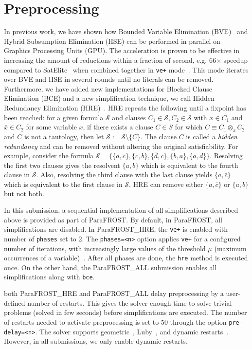 \documentclass[conference]{IEEEtran}
\newcommand{\parafrost}{ParaFROST\xspace}
\newcommand{\parafrostHRE}{ParaFROST\_HRE\xspace}
\newcommand{\parafrostALL}{ParaFROST\_ALL\xspace}
\begin{document}
\section{Preprocessing}
In previous work, we have shown how Bounded Variable Elimination (BVE)~\cite{niver,satelite} and Hybrid Subsumption Elimination (HSE) can be performed in parallel on Graphics Processing Units (GPU). The acceleration is proven to be effective in increasing the amount of reductions within a fraction of second, e.g. 66$\times$ speedup compared to SatElite~\cite{satelite} when combined together in \texttt{ve+} mode~\cite{sigmaTacas}. This mode iterates over BVE and HSE in several rounds until no literals can be removed. 
Furthermore, we have added new implementations for Blocked Clause Elimination (BCE) and a new simplification technique, we call Hidden Redundancy Elimination (HRE)~\cite{sigmaIfm}. HRE repeats the following until a fixpoint has been reached: for a given formula $\mathcal{S}$ and clauses $C_1\in\mathcal{S},C_2\in\mathcal{S}$ with $x\in C_1$ and $\bar{x}\in C_2$ for some variable $x$, if there exists a clause $C\in S$ for which $C\equiv C_1 \otimes_{x} C_2$ and $C$ is not a tautology, then let $\mathcal{S} := \mathcal{S} \setminus \{C\}$. The clause $C$ is called a \emph{hidden redundancy} and can be removed without altering the original satisfiability.
For example, consider the formula $\mathcal{S}=\{\{a,\bar{c}\},\{c,b\},\{\bar{d},\bar{c}\},\{b, a\},\{a,d\}\}$.
Resolving the first two clauses gives the resolvent $\{a,b\}$ which is equivalent to the fourth clause in $\mathcal{S}$. Also, resolving the third clause with the last clause yields $\{a,\bar{c}\}$ which is equivalent to the first clause in $\mathcal{S}$. HRE can remove either $\{a,\bar{c}\}$ or $\{a,b\}$ but not both.

In this submission, a sequential implementation of all simplifications described above is provided as part of \parafrost. By default, in \parafrost, all simplifications are disabled. 
In \parafrostHRE, the \texttt{ve+} is enabled with number of \texttt{phases} set to 2. The \texttt{phases=<n>} option applies \texttt{ve+} for a configured number of iterations, with increasingly large values of the threshold $\mu$ (maximum occurrences of a variable)~\cite{sigmaTacas,sigmaIfm}. After all phases are done, the \texttt{hre} method is executed once. On the other hand, the \parafrostALL submission enables all simplifications along with \texttt{bce}.

both \parafrostHRE and \parafrostALL delay preprocessing by a user-defined number of restarts. This gives the solver enough time to solve trivial problems (solved in few seconds) before simplifications are executed. The number of restarts needed to activate preprocessing is set to 50 through the option \texttt{pre-delay=<n>}. The solver supports geometric~\cite{geoRestart}, Luby~\cite{minisat}, and dynamic restarts~\cite{dynamicRestarts}. However, in all submissions, we only enable dynamic restarts.
%
%
\end{document}
